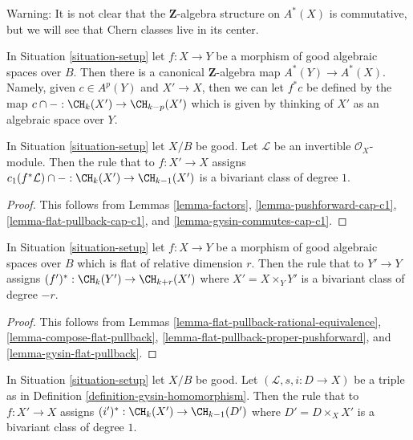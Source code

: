 \noindent
Warning: It is not clear that the $\mathbf{Z}$-algebra structure
on $A^*(X)$ is commutative, but we will see that Chern classes live
in its center.

\begin{remark}
\label{remark-pullback-cohomology}
In Situation \ref{situation-setup} let $f : X \to Y$ be a morphism of
good algebraic spaces over $B$.
Then there is a canonical $\mathbf{Z}$-algebra map $A^*(Y) \to A^*(X)$.
Namely, given $c \in A^p(Y)$ and $X' \to X$, then we can let $f^*c$
be defined by the map $c \cap - : \CH_k(X') \to \CH_{k - p}(X')$ which is
given by thinking of $X'$ as an algebraic space over $Y$.
\end{remark}

\begin{lemma}
\label{lemma-cap-c1-bivariant}
In Situation \ref{situation-setup} let $X/B$ be good.
Let $\mathcal{L}$ be an invertible $\mathcal{O}_X$-module.
Then the rule that to $f : X' \to X$ assigns
$c_1(f^*\mathcal{L}) \cap - : \CH_k(X') \to \CH_{k - 1}(X')$
is a bivariant class of degree $1$.
\end{lemma}

\begin{proof}
This follows from Lemmas \ref{lemma-factors},
\ref{lemma-pushforward-cap-c1},
\ref{lemma-flat-pullback-cap-c1}, and
\ref{lemma-gysin-commutes-cap-c1}.
\end{proof}

\begin{lemma}
\label{lemma-flat-pullback-bivariant}
In Situation \ref{situation-setup} let $f : X \to Y$ be a morphism
of good algebraic spaces over $B$ which is flat of relative dimension $r$.
Then the rule that to $Y' \to Y$ assigns
$(f')^* : \CH_k(Y') \to \CH_{k + r}(X')$ where $X' = X \times_Y Y'$
is a bivariant class of degree $-r$.
\end{lemma}

\begin{proof}
This follows from
Lemmas \ref{lemma-flat-pullback-rational-equivalence},
\ref{lemma-compose-flat-pullback},
\ref{lemma-flat-pullback-proper-pushforward}, and
\ref{lemma-gysin-flat-pullback}.
\end{proof}

\begin{lemma}
\label{lemma-gysin-bivariant}
In Situation \ref{situation-setup} let $X/B$ be good.
Let $(\mathcal{L}, s, i : D \to X)$ be a triple as in
Definition \ref{definition-gysin-homomorphism}.
Then the rule that to $f : X' \to X$ assigns
$(i')^* : \CH_k(X') \to \CH_{k - 1}(D')$ where $D' = D \times_X X'$
is a bivariant class of degree $1$.
\end{lemma}

